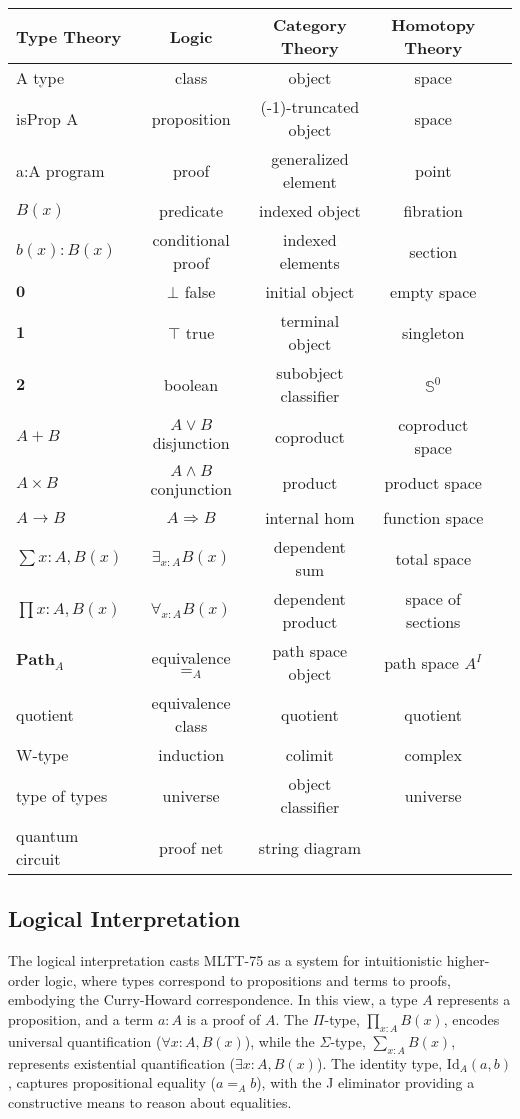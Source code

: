 \documentclass{article}
\begin{document}
\begin{table}
  \begin{tabular}{lcccc}
    \hline
       Type Theory & Logic & Category Theory & Homotopy Theory\\
    \hline
       A type & class & object & space \\
       isProp A & proposition & (-1)-truncated object & space \\
       a:A program & proof & generalized element & point \\
       $B(x)$ & predicate & indexed object & fibration \\
       $b(x) : B(x)$ & conditional proof & indexed elements & section\\
       $\mathbf{0}$ & $\bot$ false & initial object & empty space \\
       $\mathbf{1}$ & $\top$ true & terminal object & singleton \\
       $\mathbf{2}$ & boolean & subobject classifier & $\mathbb{S}^0$ \\
       $A + B$ & $A\vee B$ disjunction & coproduct & coproduct space \\
       $A\times B$ & $A\wedge B$ conjunction & product & product space \\
       $A\to B$ & $A\Rightarrow B$ & internal hom & function space \\
       $\sum{x:A},B(x)$ & $\exists_{x:A}B(x)$ & dependent sum & total space \\
       $\prod{x:A},B(x)$ & $\forall_{x:A}B(x)$ & dependent product & space of sections\\
       $\mathbf{Path}_{A}$ & equivalence $=_A$ & path space object & path space $A^I$ \\
       quotient & equivalence class & quotient & quotient \\
       W-type & induction & colimit & complex\\
       type of types & universe & object classifier & universe \\
       quantum circuit & proof net & string diagram & \\
      \hline
  \end{tabular}
\end{table}

\newpage
\subsection{Logical Interpretation}
The logical interpretation casts MLTT-75 as a system for
intuitionistic higher-order logic, where types correspond
to propositions and terms to proofs, embodying the Curry-Howard
correspondence. In this view, a type $A$ represents a proposition,
and a term $a : A$ is a proof of $A$. The $\Pi$-type, $\prod_{x:A} B(x)$,
encodes universal quantification ($\forall x : A, B(x)$),
while the $\Sigma$-type, $\sum_{x:A} B(x)$, represents existential
quantification ($\exists x : A, B(x)$). The identity type, $\text{Id}_A(a, b)$,
captures propositional equality ($a =_A b$), with the J eliminator providing a
constructive means to reason about equalities.
\end{document}

